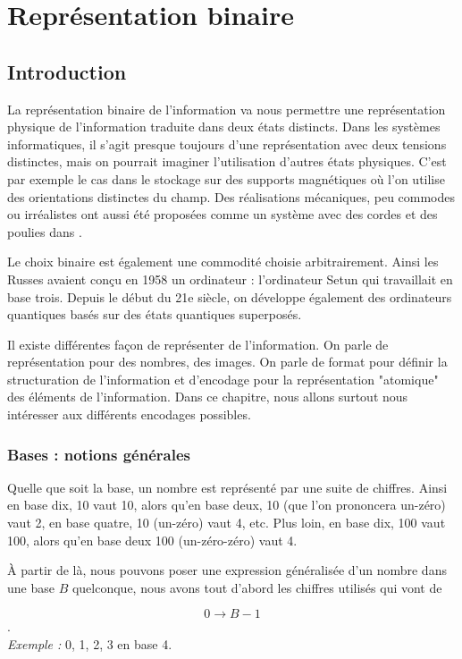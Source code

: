 \documentclass[a4paper,11pt]{book}
\theoremstyle{definition}
\begin{document}
\chapter{Représentation binaire}
\section{Introduction}
La représentation binaire de l'information va nous permettre une représentation physique de l'information traduite dans deux états distincts. Dans les systèmes informatiques, il s'agit presque toujours d'une représentation avec deux tensions distinctes, mais on pourrait imaginer l'utilisation d'autres états physiques. C'est par exemple le cas dans le stockage sur des supports magnétiques où l'on utilise des orientations distinctes du champ. Des réalisations mécaniques, peu commodes ou irréalistes ont aussi été proposées comme un système avec des cordes et des poulies dans \cite{ordiantique}.

Le choix binaire est également une commodité choisie arbitrairement. Ainsi les Russes avaient conçu en 1958 un ordinateur : l'ordinateur Setun qui travaillait en base trois. Depuis le début du 21e siècle, on développe également des ordinateurs quantiques basés sur des états quantiques superposés.

Il existe différentes façon de représenter de l'information. On parle de représentation pour des nombres, des images. On parle de format pour définir la structuration de l'information et d'encodage pour la représentation "atomique" des éléments de l'information. Dans ce chapitre, nous allons surtout nous intéresser aux différents encodages possibles.

\subsection{Bases : notions générales}
Quelle que soit la base, un nombre est représenté par une suite de chiffres. Ainsi en base dix, 10 vaut 10, alors qu'en base deux, 10 (que l'on prononcera un-zéro) vaut 2, en base quatre, 10 (un-zéro) vaut 4, etc. Plus loin, en base dix, 100 vaut 100, alors qu'en base deux 100 (un-zéro-zéro) vaut 4.

À partir de là, nous pouvons poser une expression généralisée d'un nombre dans une base $B$ quelconque, nous avons tout d'abord les chiffres utilisés qui vont de 

\[0 \rightarrow B-1\].
\\
\textit{Exemple : } 0, 1, 2, 3 en base 4.\\
\end{document}
